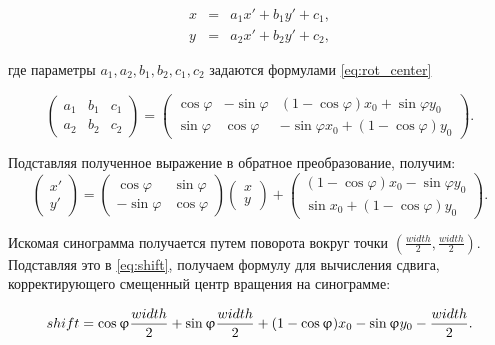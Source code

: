 $$
\begin{array}{lcr}
x & = & a_1 x' + b_1 y' + c_1, \\
y & = & a_2 x' + b_2 y' + c_2,
\end{array}
$$

где параметры $a_1, a_2, b_1, b_2, c_1, c_2$ задаются формулами \ref{eq:rot_center}

\begin{equation}\label{eq:rot_center}
\left(\begin{array}{ccc}
a_1 & b_1 & c_1 \\
a_2 & b_2 & c_2
\end{array}\right) = 
\left(\begin{array}{ccc}
\cos \varphi & -\sin \varphi & (1 - \cos\varphi) x_0 + \sin\varphi y_0 \\
\sin \varphi & \cos \varphi & -\sin\varphi x_0 + (1 - \cos\varphi) y_0
\end{array}\right).
\end{equation}

Подставляя полученное выражение в обратное преобразование, получим:
\begin{equation}\label{eq:shift}
\left(\begin{array}{c}
x' \\ y'
\end{array}\right) = 
\left(\begin{array}{cc}
\cos\varphi & \sin\varphi \\
-\sin\varphi & \cos\varphi
\end{array}\right)
\left(\begin{array}{c}
x \\ y
\end{array}\right) + 
\left(\begin{array}{c}
(1-\cos\varphi)x_0 - \sin\varphi y_0 \\
\sin x_0 + (1-\cos\varphi)y_0
\end{array}\right).
\end{equation}

Искомая синограмма получается путем поворота вокруг точки $\left(\frac{width}{2}, \frac{width}{2}\right)$.
Подставляя это в \ref{eq:shift}, получаем формулу для вычисления сдвига, корректирующего смещенный центр вращения на синограмме:

\begin{equation}\notag
shift = \cos\varphi \frac{width}{2} + \sin\varphi \frac{width}{2} + (1-\cos\varphi)x_0 - \sin\varphi y_0 - \frac{width}{2}.
\end{equation}


